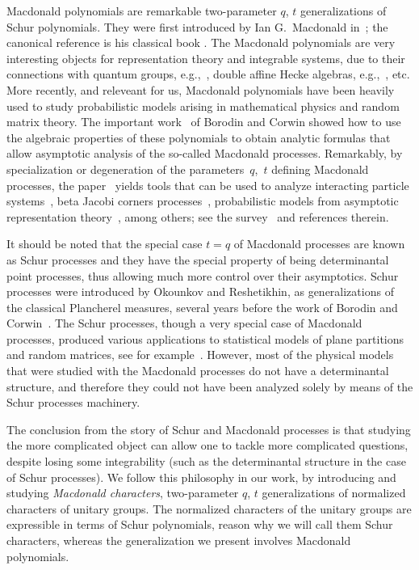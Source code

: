 \documentclass[pdftex]{sigma}
\numberwithin{equation}{section}
\begin{document}
Macdonald polynomials are remarkable two-parameter $q$, $t$ generalizations of Schur polynomials. They were f\/irst introduced by Ian G.~Macdonald in~\cite{M1}; the canonical reference is his classical book \cite{M2}. The Macdonald polynomials are very interesting objects for representation theory and integrable systems, due to their connections with quantum groups, e.g.,~\cite{EK, N}, double af\/f\/ine Hecke algebras, e.g.,~\cite{Ch, Ki}, etc. More recently, and releveant for us, Macdonald polynomials have been heavily used to study probabilistic models arising in mathematical physics and random matrix theory. The important work~\cite{BC} of Borodin and Corwin showed how to use the algebraic properties of these polynomials to obtain analytic formulas that allow asymptotic analysis of the so-called Macdonald processes. Remarkably, by specialization or degeneration of the parameters~$q$,~$t$ def\/ining Macdonald processes, the paper~\cite{BC} yields tools that can be used to analyze interacting particle systems~\cite{BCS}, beta Jacobi corners processes~\cite{BG}, probabilistic models from asymptotic representation theory~\cite{BBuO}, among others; see the survey~\cite{BP} and references therein.

It should be noted that the special case $t = q$ of Macdonald processes are known as Schur processes and they have the special property of being determinantal point processes, thus allowing much more control over their asymptotics. Schur processes were introduced by Okounkov and Reshetikhin, as generalizations of the classical Plancherel measures, several years before the work of Borodin and Corwin~\cite{Ok1, OR}. The Schur processes, though a very special case of Macdonald processes, produced various applications to statistical models of plane partitions and random matrices, see for example~\cite{J, OR2}. However, most of the physical models that were studied with the Macdonald processes do not have a determinantal structure, and therefore they could not have been analyzed solely by means of the Schur processes machinery.

The conclusion from the story of Schur and Macdonald processes is that studying the more complicated object can allow one to tackle more complicated questions, despite losing some integrability (such as the determinantal structure in the case of Schur processes). We follow this philosophy in our work, by introducing and studying \textit{Macdonald characters}, two-parameter $q$, $t$ generalizations of normalized characters of unitary groups.
The normalized characters of the unitary groups are expressible in terms of Schur polynomials, reason why we will call them Schur characters, whereas the generalization we present involves Macdonald polynomials.
\end{document}
